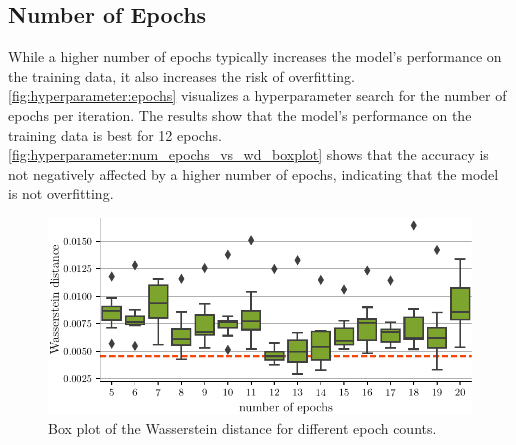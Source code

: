 \subsection{Number of Epochs}
While a higher number of epochs typically increases the model's performance on the training data,
it also increases the risk of overfitting.
%
\autoref{fig:hyperparameter:epochs} visualizes a hyperparameter search for the number of epochs per \dsea{} iteration.
The results show that the model's performance on the training data is best for \num{12} epochs.
\autoref{fig:hyperparameter:num_epochs_vs_wd_boxplot} shows that
the accuracy is not negatively affected by a higher number of epochs,
  indicating that the model is not overfitting.

\begin{figure}
  \centering
  \includegraphics[width=\textwidth]{content/plots/hyperparam/num_epochs_vs_wd_boxplot_lessheight.pdf}
  \caption{Box plot of the Wasserstein distance for different epoch counts.}
  \label{fig:hyperparameter:epochs}
\end{figure}
